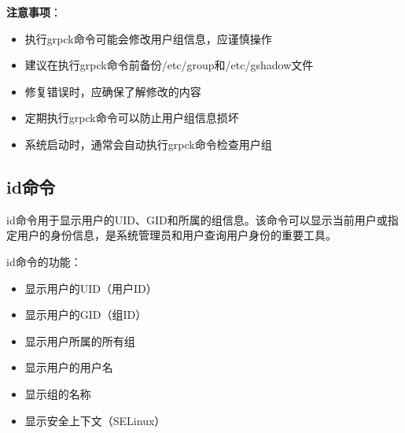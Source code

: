 \documentclass[12pt,UTF8]{ctexbook}
\begin{document}
\textbf{注意事项}：
\begin{itemize}
    \item 执行grpck命令可能会修改用户组信息，应谨慎操作
    \item 建议在执行grpck命令前备份/etc/group和/etc/gshadow文件
    \item 修复错误时，应确保了解修改的内容
    \item 定期执行grpck命令可以防止用户组信息损坏
    \item 系统启动时，通常会自动执行grpck命令检查用户组
\end{itemize}

\subsection{id命令}
id命令用于显示用户的UID、GID和所属的组信息。该命令可以显示当前用户或指定用户的身份信息，是系统管理员和用户查询用户身份的重要工具。

id命令的功能：
\begin{itemize}
    \item 显示用户的UID（用户ID）
    \item 显示用户的GID（组ID）
    \item 显示用户所属的所有组
    \item 显示用户的用户名
    \item 显示组的名称
    \item 显示安全上下文（SELinux）
\end{itemize}
\end{document}
